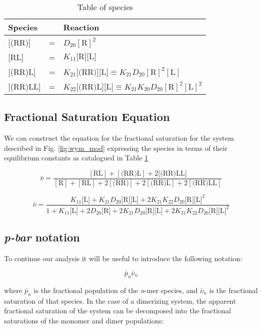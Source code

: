 \begin{table}[h]
\centering
\begin{tabular}{lcl}
\toprule
Species & & Reaction \\
\midrule
{[(RR)]} & = & \(D_{20}[\text{R}]^2\) \\
{[RL]} & = & \(K_{11}\text{[R][L]}\) \\
{[(RR)L]} & = & \(K_{21}\text{[(RR)][L]} \equiv K_{21} D_{20}[\text{R}]^2[\text{L}]\) \\
{[(RR)LL]} & = & \(K_{22}\text{[(RR)L][L]} \equiv K_{21}K_{20}D_{20}[\text{R}]^2[\text{L}]^2\) \\
\bottomrule
\end{tabular}
\caption{Table of species}
\label{tab:spec}
\end{table}


\subsection{Fractional Saturation Equation}
We can construct the equation for the fractional saturation for the system described in Fig. \ref{fig:wym_mod} expressing the species in terms of their equilibrium constants as catalogued in Table \ref{tab:spec}


\begin{equation}
\bar{\nu}=\frac{[\text{RL}] + [\text{(RR)L}] + 2[\text{(RR)LL]}}{[\text{R}]+ [\text{RL}] + 2[\text{(RR)}] + 2[\text{(RR)L}] + 2[\text{(RR)LL}]}
\end{equation}

\begin{equation} \label{eq:wym_fsat}
\bar{\nu}=\frac{K_{11}\text{[L]} + K_{21}D_{20}\text{[R][L]} + 2 K_{21} K_{22} D_{20}\text{[R]}\text{[L]}^2}{1 + K_{11}\text{[L]} + 2 D_{20}\text{[R]} + 2 K_{21} D_{20} \text{[R][L]} + 2 K_{21} K_{22} D_{20} \text{[R]}\text{[L]}^2}
\end{equation}

\subsection{\emph{p-bar} notation}

To continue our analysis it will be useful to introduce the following notation:

\begin{equation}
	\bar{p}_n \bar{\nu}_{n}
\end{equation}

where \(\bar{p}_n\) is the fractional population of the \emph{n}-mer species, and \(\bar{\nu}_n\) is the fractional saturation of that species. In the case of a dimerizing system, the apparent fractional saturation of the system can be decomposed into the fractional saturations of the monomer and dimer populations:

